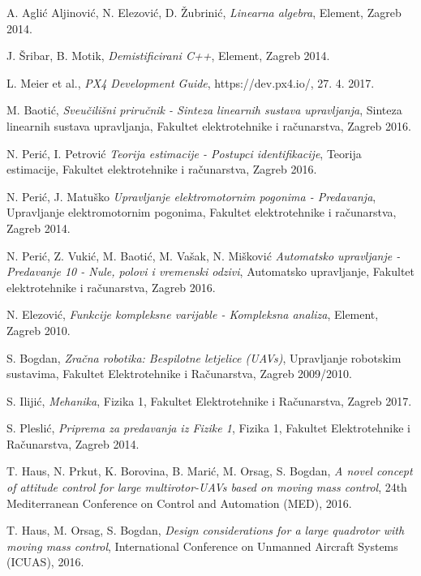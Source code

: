 \documentclass[11pt,a4paper]{article}
\begin{document}

\begin{thebibliography}{9}
 
  A. Aglić Aljinović, N. Elezović, D. Žubrinić,
  \emph{Linearna algebra},
  Element,
  Zagreb 2014.
 
 J. Šribar, B. Motik,
 \emph{Demistificirani C++},
 Element,
 Zagreb 2014.
 
 L. Meier et al.,
 \emph{PX4 Development Guide}, https://dev.px4.io/,
 27. 4. 2017.
 
  M. Baotić,
  \emph{Sveučilišni priručnik - Sinteza linearnih sustava upravljanja},
  Sinteza linearnih sustava upravljanja, Fakultet elektrotehnike i računarstva,
  Zagreb 2016. 
  
  N. Perić, I. Petrović
  \emph{Teorija estimacije - Postupci identifikacije},
  Teorija estimacije, Fakultet elektrotehnike i računarstva,
  Zagreb 2016. 
  
  N. Perić, J. Matuško
  \emph{Upravljanje elektromotornim pogonima - Predavanja},
  Upravljanje elektromotornim pogonima, Fakultet elektrotehnike i računarstva,
  Zagreb 2014. 
  
  N. Perić, Z. Vukić, M. Baotić, M. Vašak, N. Mišković
  \emph{Automatsko upravljanje - Predavanje 10 - Nule, polovi i vremenski odzivi},
  Automatsko upravljanje, Fakultet elektrotehnike i računarstva,
  Zagreb 2016. 
  
  N. Elezović,
  \emph{Funkcije kompleksne varijable - Kompleksna analiza},
  Element,
  Zagreb 2010.
   
  
  S. Bogdan,
  \emph{Zračna robotika: Bespilotne letjelice (UAVs)},
  Upravljanje robotskim sustavima, Fakultet Elektrotehnike i Računarstva,
  Zagreb 2009/2010.
  
  S. Ilijić,
  \emph{Mehanika},
  Fizika 1, Fakultet Elektrotehnike i Računarstva,
  Zagreb 2017.
  
  S. Pleslić,
  \emph{Priprema za predavanja iz Fizike 1},
  Fizika 1, Fakultet Elektrotehnike i Računarstva,
  Zagreb 2014.
  
  T. Haus, N. Prkut, K. Borovina, B. Marić, M. Orsag, S. Bogdan,
  \emph{A novel concept of attitude control for large multirotor-UAVs based on moving mass control},
  24th Mediterranean Conference on Control and Automation (MED),
  2016.
  
  T. Haus, M. Orsag, S. Bogdan,
  \emph{Design considerations for a large quadrotor with moving mass control},
  International Conference on Unmanned Aircraft Systems (ICUAS),
  2016.
 

\end{thebibliography}
\end{document}
